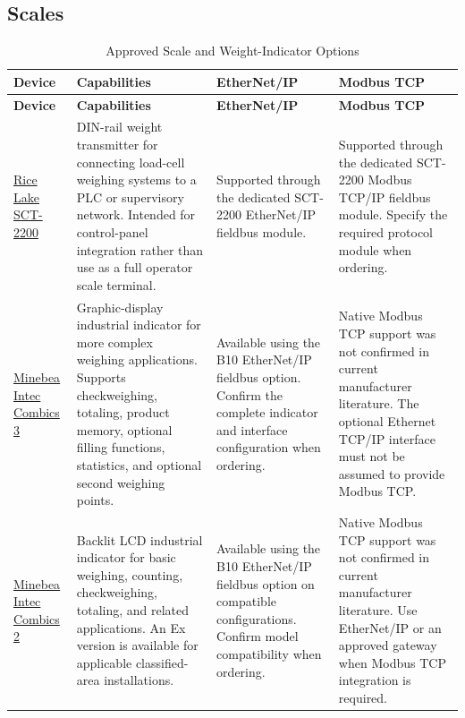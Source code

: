 \subsection{Scales}
\begin{longtable}{@{}P{2.98cm}P{5.27cm}P{3.48cm}P{3.48cm}@{}}
\caption{Approved Scale and Weight-Indicator Options}\label{tab:scales} \\
\toprule
{}\textbf{Device} & \textbf{Capabilities} & \textbf{EtherNet/IP} & \textbf{Modbus TCP} \\
\midrule
\endfirsthead
\toprule
{}\textbf{Device} & \textbf{Capabilities} & \textbf{EtherNet/IP} & \textbf{Modbus TCP} \\
\midrule
\endhead
\href{https://www.ricelake.com/resources/catalogs/sct-2200-catalog-page}{Rice Lake SCT-2200} & DIN-rail weight transmitter for connecting load-cell weighing systems to a PLC or supervisory network. Intended for control-panel integration rather than use as a full operator scale terminal. & Supported through the dedicated SCT-2200 EtherNet/IP fieldbus module. & Supported through the dedicated SCT-2200 Modbus TCP/IP fieldbus module. Specify the required protocol module when ordering. \\
\href{https://www.minebea-intec.com/en/industrial-scales/weight-indicators/weight-indicator-combics}{Minebea Intec Combics 3} & Graphic-display industrial indicator for more complex weighing applications. Supports checkweighing, totaling, product memory, optional filling functions, statistics, and optional second weighing points. & Available using the B10 EtherNet/IP fieldbus option. Confirm the complete indicator and interface configuration when ordering. & Native Modbus TCP support was not confirmed in current manufacturer literature. The optional Ethernet TCP/IP interface must not be assumed to provide Modbus TCP. \\
\href{https://www.minebea-intec.com/en/industrial-scales/weight-indicators/weight-indicator-combics}{Minebea Intec Combics 2} & Backlit LCD industrial indicator for basic weighing, counting, checkweighing, totaling, and related applications. An Ex version is available for applicable classified-area installations. & Available using the B10 EtherNet/IP fieldbus option on compatible configurations. Confirm model compatibility when ordering. & Native Modbus TCP support was not confirmed in current manufacturer literature. Use EtherNet/IP or an approved gateway when Modbus TCP integration is required. \\
\bottomrule
\end{longtable}

